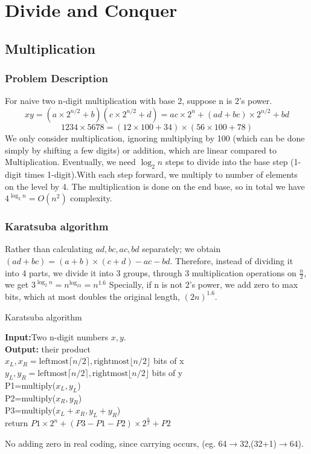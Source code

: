 \section{Divide and Conquer}
\subsection{Multiplication}
\subsubsection{Problem Description}
For naive two n-digit multiplication with base 2, suppose n is 2's power.
\[
    xy=(a\times 2^{n/2}+b)(c\times 2^{n/2}+d)=ac\times 2^n+(ad+bc)\times 2^{n/2}+bd
    \]
    \[
        1234\times5678=(12\times100+34)\times(56\times100+78) 
    \]
    We only consider multiplication, ignoring multiplying by 100 (which can be done simply by shifting a few digits) or addition, which are linear compared to Multiplication.
    Eventually, we need $\log_2 n$ steps to divide into the base step (1-digit times 1-digit).With each step forward, we multiply to number of elements on the level by 4. 
    The multiplication is done on the end base, so in total we have $4^{\log_2n}=O(n^2)$ complexity.
\subsubsection{Karatsuba algorithm}
    Rather than calculating $ad,bc,ac,bd$ separately; we obtain $(ad+bc)=(a+b)\times(c+d)-ac-bd$.
    Therefore, instead of dividing it into 4 parts, we divide it into 3 groups, through 3 multiplication operations on $\frac{n}{2}$, we get $3^{\log_2n}=n^{\log_23}=n^{1.6}$
    Specially, if n is not 2's power, we add zero to max bits, which at most doubles the original length, $(2n)^1.6$.
    \begin{algorithm}
    \caption{Karatsuba algorithm}
    \textbf{Input:}Two n-digit numbers $x,y$. \\
    \textbf{Output:} their product\\
    $x_L,x_R=\text{leftmost} \lceil n/2\rceil ,\text{rightmost} \lfloor n/2 \rfloor $ bits of x\\
    $y_L,y_R=\text{leftmost} \lceil n/2\rceil ,\text{rightmost} \lfloor n/2 \rfloor $ bits of y\\
    P1=multiply($x_L,y_L$) \\
    P2=multiply($x_R,y_R$) \\
    P3=multiply($x_L+x_R,y_L+y_R$) \\
    return $P1\times 2^n+(P3-P1-P2)\times 2^{\frac{n}{2}}+P2$
    \end{algorithm}
    No adding zero in real coding, since carrying occurs, (eg. 64$\rightarrow$32,(32+1)$\rightarrow$64).


